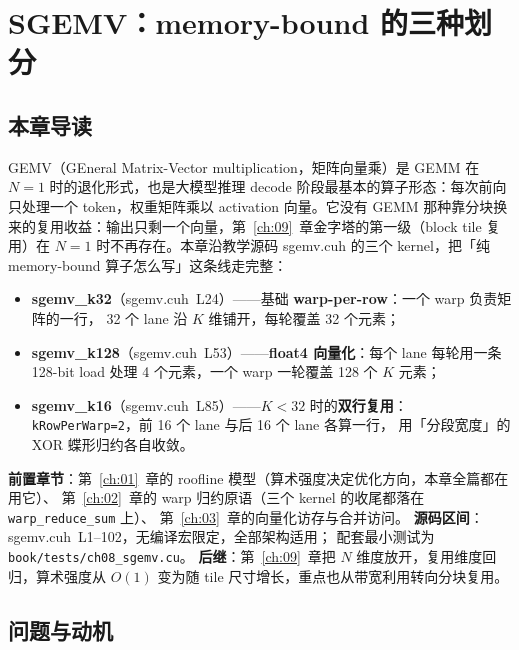 \chapter{SGEMV：memory-bound 的三种划分}\label{ch:08}

\section{本章导读}

GEMV（GEneral Matrix-Vector multiplication，矩阵向量乘）是 GEMM 在 $N = 1$ 时的退化形式，也是大模型推理 decode 阶段最基本的算子形态：每次前向只处理一个 token，权重矩阵乘以 activation 向量。它没有 GEMM 那种靠分块换来的复用收益：输出只剩一个向量，第~\ref{ch:09}~章金字塔的第一级（block tile 复用）在 $N=1$ 时不再存在。本章沿教学源码 sgemv.cuh 的三个 kernel，把「纯 memory-bound 算子怎么写」这条线走完整：

\begin{itemize}
  \item \textbf{sgemv\_k32}（sgemv.cuh~L24）——基础 \textbf{warp-per-row}：一个 warp 负责矩阵的一行，
        32 个 lane 沿 $K$ 维铺开，每轮覆盖 32 个元素；
  \item \textbf{sgemv\_k128}（sgemv.cuh~L53）——\textbf{float4 向量化}：每个 lane 每轮用一条
        128-bit load 处理 4 个元素，一个 warp 一轮覆盖 128 个 $K$ 元素；
  \item \textbf{sgemv\_k16}（sgemv.cuh~L85）——$K < 32$ 时的\textbf{双行复用}：
        \texttt{k\allowbreak{}Row\allowbreak{}Per\allowbreak{}Warp=\allowbreak{}2}，前 16 个 lane 与后 16 个 lane 各算一行，
        用「分段宽度」的 XOR 蝶形归约各自收敛。
\end{itemize}

\textbf{前置章节}：第~\ref{ch:01}~章的 roofline 模型（算术强度决定优化方向，本章全篇都在用它）、
第~\ref{ch:02}~章的 warp 归约原语（三个 kernel 的收尾都落在 \texttt{warp\_\allowbreak{}reduce\_\allowbreak{}sum} 上）、
第~\ref{ch:03}~章的向量化访存与合并访问。
\textbf{源码区间}：sgemv.cuh~L1--102，无编译宏限定，全部架构适用；
配套最小测试为 \texttt{book/\allowbreak{}tests/\allowbreak{}ch08\_\allowbreak{}sgemv.\allowbreak{}cu}。
\textbf{后继}：第~\ref{ch:09}~章把 $N$ 维度放开，复用维度回归，算术强度从 $O(1)$
变为随 tile 尺寸增长，重点也从带宽利用转向分块复用。

\section{问题与动机}

